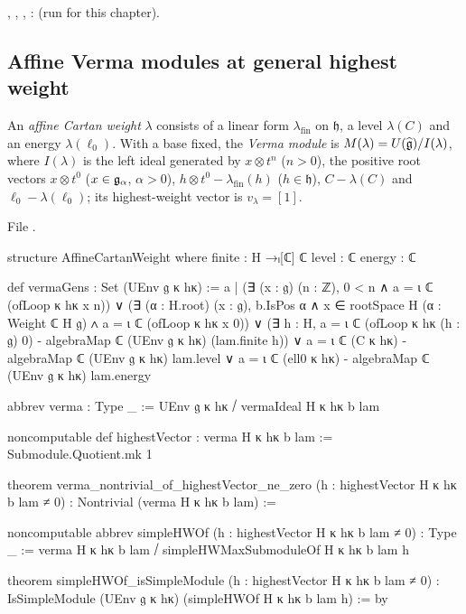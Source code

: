 \begin{status}
\allowbreak{}\allowbreak{}\allowbreak{}, \allowbreak{}\allowbreak{},
\allowbreak{}\allowbreak{}\allowbreak{}, \allowbreak{}\allowbreak{}\allowbreak{}\allowbreak{}:
 (run for this chapter).
\end{status}

\subsection{Affine Verma modules at general highest weight}

\begin{definition}\label{l02:def:verma}
An \emph{affine Cartan weight} $\lambda$ consists of a linear form $\lambda_{\mathrm{fin}}$ on $\mathfrak h$, a level
$\lambda(C)$ and an energy $\lambda(\ell_0)$. With a base fixed, the \emph{Verma module} is
$M(\lambda) = U(\widehat{\mathfrak{g}})/I(\lambda)$, where $I(\lambda)$ is the left ideal generated by $x\otimes t^n$ ($n>0$),
the positive root vectors $x\otimes t^0$ ($x\in\mathfrak{g}_\alpha$, $\alpha>0$), $h\otimes t^0-\lambda_{\mathrm{fin}}(h)$
($h\in\mathfrak h$), $C-\lambda(C)$ and $\ell_0-\lambda(\ell_0)$; its highest-weight vector is $v_\lambda = [1]$.
\end{definition}

File .
\begin{leancode}
structure AffineCartanWeight where
  finite : H →ₗ[ℂ] ℂ
  level : ℂ
  energy : ℂ

def vermaGens : Set (UEnv 𝔤 κ hκ) :=
  {a | (∃ (x : 𝔤) (n : ℤ), 0 < n ∧ a = ι ℂ (ofLoop κ hκ x n))
      ∨ (∃ (α : H.root) (x : 𝔤), b.IsPos α ∧ x ∈ rootSpace H (α : Weight ℂ H 𝔤) ∧
          a = ι ℂ (ofLoop κ hκ x 0))
      ∨ (∃ h : H,
          a = ι ℂ (ofLoop κ hκ (h : 𝔤) 0) - algebraMap ℂ (UEnv 𝔤 κ hκ) (lam.finite h))
      ∨ a = ι ℂ (C κ hκ) - algebraMap ℂ (UEnv 𝔤 κ hκ) lam.level
      ∨ a = ι ℂ (ell0 κ hκ) - algebraMap ℂ (UEnv 𝔤 κ hκ) lam.energy}

abbrev verma : Type _ := UEnv 𝔤 κ hκ ⧸ vermaIdeal H κ hκ b lam

noncomputable def highestVector : verma H κ hκ b lam := Submodule.Quotient.mk 1

theorem verma_nontrivial_of_highestVector_ne_zero
    (h : highestVector H κ hκ b lam ≠ 0) : Nontrivial (verma H κ hκ b lam) :=

noncomputable abbrev simpleHWOf (h : highestVector H κ hκ b lam ≠ 0) : Type _ :=
  verma H κ hκ b lam ⧸ simpleHWMaxSubmoduleOf H κ hκ b lam h

theorem simpleHWOf_isSimpleModule (h : highestVector H κ hκ b lam ≠ 0) :
    IsSimpleModule (UEnv 𝔤 κ hκ) (simpleHWOf H κ hκ b lam h) := by
\end{leancode}

